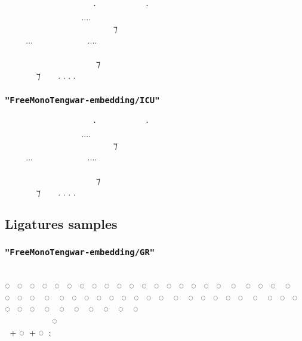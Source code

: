 \documentclass{article}
\begin{document}
\embedAAT
  ‍   ⸱‍  ‍ ⸱ \\
    ‍....  ‍  \\
  ‍   ‍ ‍ ⁊ ‍  \\
...  ....   \\
         ‍ \\
 ‍ ‍‍   ⁊  ‍ ‍ \\
 ‍ ⁊  . . . . \normalfont

\subsubsection*{\texttt{"FreeMonoTengwar-embedding/ICU"}}

\embedICU
  ‍   ⸱‍  ‍ ⸱ \\
    ‍....  ‍  \\
  ‍   ‍ ‍ ⁊ ‍  \\
...  ....   \\
         ‍ \\
 ‍ ‍‍   ⁊  ‍ ‍ \\
 ‍ ⁊  . . . . \normalfont


\newpage

\subsection{Ligatures samples}

\subsubsection*{\texttt{"FreeMonoTengwar-embedding/GR"}}

\embedGR
                          \\
◌ ◌ ◌ ◌ ◌ ◌ ◌ ◌ ◌ ◌ ◌ ◌ ◌ ◌ ◌ ◌ ◌ ◌ ◌ ◌ ◌ ◌ ◌ ◌ ◌ ◌ ◌ ◌ ◌ ◌ ◌ ◌ ◌ ◌ ◌ ◌ ◌ ◌ ◌ ◌ ◌ ◌ ◌ ◌ ◌ ◌ ◌ ◌ ◌ ◌ ◌ ◌ ◌ ◌ ◌ ◌\\
      ◌‍ ‍ ‍ ‍ \\
 \normalfont + \embedGR ◌ \normalfont + \embedGR ◌ : 
\end{document}
